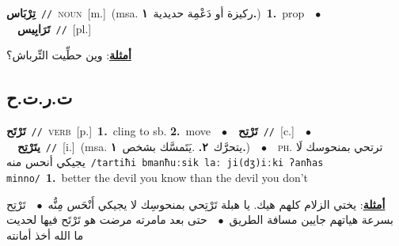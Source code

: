 \documentclass[10pt,a4paper,twoside]{article} %
\begin{document}
\begin{multicols}{2}
{\setlength\topsep{0pt}\textbf{\foreignlanguage{arabic}{تِرْبَاس}}\ {\color{gray}\texttt{//}\color{black}}\ \textsc{noun}\ [m.]\ \color{gray}(msa. \foreignlanguage{arabic}{ركيزة أو دَعْمِة حديدية}~\foreignlanguage{arabic}{\textbf{١.}})\color{black}\ \textbf{1.}~prop\ \ $\bullet$\ \ \setlength\topsep{0pt}\textbf{\foreignlanguage{arabic}{تَرَابِيس}}\ {\color{gray}\texttt{//}\color{black}}\ [pl.]\  \begin{flushright}\color{gray}\foreignlanguage{arabic}{\textbf{\underline{\foreignlanguage{arabic}{أمثلة}}}: وين حطِّيت التِّرباش؟}\end{flushright}\color{black}} \vspace{2mm}

\vspace{-3mm}
\subsection*{\color{blue}\foreignlanguage{arabic}{ت.ر.ت.ح}\color{blue}{}} 

{\setlength\topsep{0pt}\textbf{\foreignlanguage{arabic}{تَرْتَح}}\ {\color{gray}\texttt{//}\color{black}}\ \textsc{verb}\ [p.]\ \textbf{1.}~cling to sb.  \textbf{2.}~move\ \ $\bullet$\ \ \setlength\topsep{0pt}\textbf{\foreignlanguage{arabic}{تَرْتِح}}\ {\color{gray}\texttt{//}\color{black}}\ [c.]\ \ $\bullet$\ \ \setlength\topsep{0pt}\textbf{\foreignlanguage{arabic}{يتَرْتِح}}\ {\color{gray}\texttt{//}\color{black}}\ [i.]\ \color{gray}(msa. \foreignlanguage{arabic}{يتحرَّك}~\foreignlanguage{arabic}{\textbf{٢.}}  .\foreignlanguage{arabic}{يَتَمسَّك بشخص}~\foreignlanguage{arabic}{\textbf{١.}})\color{black}\ \ $\bullet$\ \ \textsc{ph.} \color{gray} \foreignlanguage{arabic}{ترتحي بمنحوسك لَا يجيكي أنحس منه}\color{black}\ {\color{gray}\texttt{/{\sffamily tartiħi bmanħuːsik laː ji(dʒ)iːki ʔanħas minno}/}\color{black}}\ \textbf{1.}~better the devil you know than the devil you don't\  \begin{flushright}\color{gray}\foreignlanguage{arabic}{\textbf{\underline{\foreignlanguage{arabic}{أمثلة}}}: يختي الزلام كلهم هيك. يا هبلة تَرْتِحي بمنحوسِك لا يجيكي أَنْحَس مِنُّه\ $\bullet$\ \  تَرْتِح بسرعة هياتهم جايين مسافة الطريق\ $\bullet$\ \  حتى بعد مامرته مرضت هو تَرْتَح فيها لحديت ما الله أخذ أمانته}\end{flushright}\color{black}} \vspace{2mm}


\end{multicols}
\end{document}
